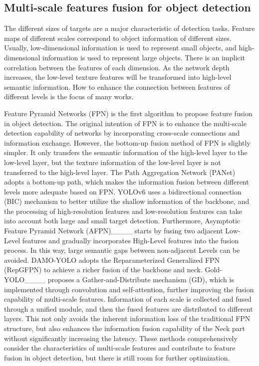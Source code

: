 \subsection{Multi-scale features fusion for object detection}
The different sizes of targets are a major characteristic of detection tasks. Feature maps of different scales correspond to object information of different sizes. Usually, low-dimensional information is used to represent small objects, and high-dimensional information is used to represent large objects. There is an implicit correlation between the features of each dimension. As the network depth increases, the low-level texture features will be transformed into high-level semantic information. How to enhance the connection between features of different levels is the focus of many works. 

Feature Pyramid Networks (FPN) is the first algorithm to propose feature fusion in object detection. The original intention of FPN is to enhance the multi-scale detection capability of networks by incorporating cross-scale connections and information exchange. However, the bottom-up fusion method of FPN is slightly simpler. It only transfers the semantic information of the high-level layer to the low-level layer, but the texture information of the low-level layer is not transferred to the high-level layer. The Path Aggregation Network (PANet) adopts a bottom-up path, which makes the information fusion between different levels more adequate based on FPN. YOLOv6 uses a bidirectional connection (BIC) mechanism to better utilize the shallow information of the backbone, and the processing of high-resolution features and low-resolution features can take into account both large and small target detection. Furthermore, Asymptotic Feature Pyramid Network (AFPN)____ starts by fusing two adjacent Low-Level features and gradually incorporates High-Level features into the fusion process. In this way, large semantic gaps between non-adjacent Levels can be avoided. DAMO-YOLO adopts the Reparameterized Generalized FPN (RepGFPN) to achieve a richer fusion of the backbone and neck. Gold-YOLO____ proposes a Gather-and-Distribute mechanism (GD), which is implemented through convolution and self-attention, further improving the fusion capability of multi-scale features. Information of each scale is collected and fused through a unified module, and then the fused features are distributed to different layers. This not only avoids the inherent information loss of the traditional FPN structure, but also enhances the information fusion capability of the Neck part without significantly increasing the latency. These methods comprehensively consider the characteristics of multi-scale features and contribute to feature fusion in object detection, but there is still room for further optimization.

